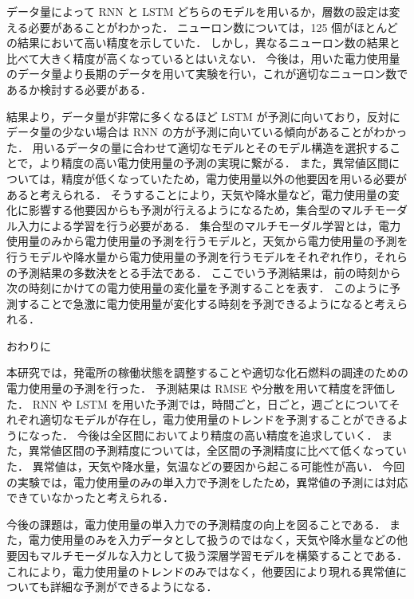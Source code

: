 \documentclass[twocolumn,fleqn,10pt]{jarticle}
\makeatletter
\renewcommand{\section}{\@startsection
{section}{3}{0mm}{5mm}{5mm}{\bfseries \normalsize}}
\makeatother
\begin{document}
データ量によって RNN と LSTM どちらのモデルを用いるか，層数の設定は変える必要があることがわかった．
ニューロン数については，125 個がほとんどの結果において高い精度を示していた．
しかし，異なるニューロン数の結果と比べて大きく精度が高くなっているとはいえない．
今後は，用いた電力使用量のデータ量より長期のデータを用いて実験を行い，これが適切なニューロン数であるか検討する必要がある．





結果より，データ量が非常に多くなるほど LSTM が予測に向いており，反対にデータ量の少ない場合は RNN の方が予測に向いている傾向があることがわかった．
用いるデータの量に合わせて適切なモデルとそのモデル構造を選択することで，より精度の高い電力使用量の予測の実現に繋がる．
また，異常値区間については，精度が低くなっていたため，電力使用量以外の他要因を用いる必要があると考えられる．
そうすることにより，天気や降水量など，電力使用量の変化に影響する他要因からも予測が行えるようになるため，集合型のマルチモーダル入力による学習を行う必要がある．
集合型のマルチモーダル学習とは，電力使用量のみから電力使用量の予測を行うモデルと，天気から電力使用量の予測を行うモデルや降水量から電力使用量の予測を行うモデルをそれぞれ作り，それらの予測結果の多数決をとる手法である．
ここでいう予測結果は，前の時刻から次の時刻にかけての電力使用量の変化量を予測することを表す．
このように予測することで急激に電力使用量が変化する時刻を予測できるようになると考えられる．











\section{おわりに}


本研究では，発電所の稼働状態を調整することや適切な化石燃料の調達のための電力使用量の予測を行った．
予測結果は RMSE や分散を用いて精度を評価した．
RNN や LSTM を用いた予測では，時間ごと，日ごと，週ごとについてそれぞれ適切なモデルが存在し，電力使用量のトレンドを予測することができるようになった．
今後は全区間においてより精度の高い精度を追求していく．
また，異常値区間の予測精度については，全区間の予測精度に比べて低くなっていた．
異常値は，天気や降水量，気温などの要因から起こる可能性が高い．
今回の実験では，電力使用量のみの単入力で予測をしたため，異常値の予測には対応できていなかったと考えられる．


今後の課題は，電力使用量の単入力での予測精度の向上を図ることである．
また，電力使用量のみを入力データとして扱うのではなく，天気や降水量などの他要因もマルチモーダルな入力として扱う深層学習モデルを構築することである．
これにより，電力使用量のトレンドのみではなく，他要因により現れる異常値についても詳細な予測ができるようになる．
\end{document}
